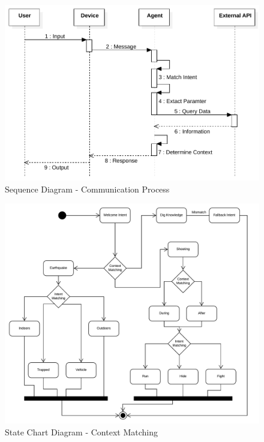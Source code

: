 \documentclass{scrreprt}
\begin{document}
\begin{figure}[ht!]
    \centering
    \includegraphics[angle=90, height=.95\textheight]{imgs/SequenceDiagram1.pdf}
    \caption{Sequence Diagram - Communication Process}
    \label{fig:sequencediagram1}
\end{figure}

\clearpage

\begin{figure}[ht!]
    \centering
    \includegraphics[angle=90, width=.95\textwidth]{img3/state1.pdf}
    \caption{State Chart Diagram - Context Matching}
    \label{fig:statechartdiagram1}
\end{figure}

\clearpage
\end{document}
